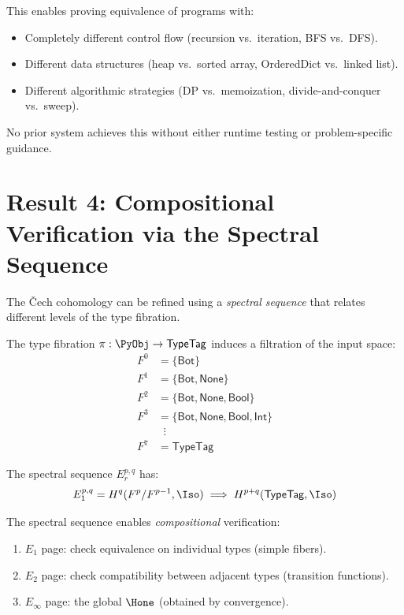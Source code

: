 This enables proving equivalence of programs with:
\begin{itemize}
  \item Completely different control flow (recursion vs.\ iteration,
    BFS vs.\ DFS).
  \item Different data structures (heap vs.\ sorted array,
    OrderedDict vs.\ linked list).
  \item Different algorithmic strategies (DP vs.\ memoization,
    divide-and-conquer vs.\ sweep).
\end{itemize}

No prior system achieves this without either runtime testing or
problem-specific guidance.

\section{Result 4: Compositional Verification via the Spectral Sequence}

The \v{C}ech cohomology can be refined using a \emph{spectral sequence}
that relates different levels of the type fibration.

\begin{definition}
The type fibration $\pi : \PyObj \to \mathsf{TypeTag}$ induces a
filtration of the input space:
\begin{align}
  F^0 &= \{\mathsf{Bot}\} \\
  F^1 &= \{\mathsf{Bot}, \mathsf{None}\} \\
  F^2 &= \{\mathsf{Bot}, \mathsf{None}, \mathsf{Bool}\} \\
  F^3 &= \{\mathsf{Bot}, \mathsf{None}, \mathsf{Bool}, \mathsf{Int}\} \\
  &\;\;\vdots \\
  F^7 &= \mathsf{TypeTag}
\end{align}

The spectral sequence $E_r^{p,q}$ has:
\[
  E_1^{p,q} = H^q(F^p / F^{p-1}, \Iso) \implies
  H^{p+q}(\mathsf{TypeTag}, \Iso)
\]
\end{definition}

The spectral sequence enables \emph{compositional} verification:
\begin{enumerate}
  \item $E_1$ page: check equivalence on individual types (simple
    fibers).
  \item $E_2$ page: check compatibility between adjacent types
    (transition functions).
  \item $E_\infty$ page: the global $\Hone$ (obtained by convergence).
\end{enumerate}

